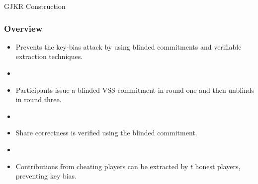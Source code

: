 \documentclass[hyperref={pdfpagelabels=true},table,dvipsnames,14pt,aspectratio=169]{beamer}
\begin{document}
\begin{frame}
  \centering
{}
\end{frame}


\begin{frame}
  \huge
  \centering
  GJKR Construction
\end{frame}

\begin{frame}
  \frametitle{Overview}

  \begin{itemize}
    \item Prevents the key-bias attack by using blinded commitments and verifiable extraction techniques.
    \item[]
    \item<2-> Participants issue a blinded VSS commitment in round one and then unblinds in round three.
    \item[]
    \item<3-> Share correctness is verified using the blinded commitment.
    \item[]
    \item<4-> Contributions from cheating players can be extracted by $t$ honest players, preventing key bias.
  \end{itemize}
\end{frame}
\end{document}
